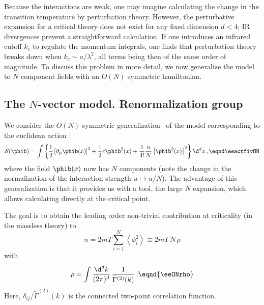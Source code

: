     Because the interactions are weak, one may imagine calculating the change in the transition temperature by perturbation theory.  However, the
perturbative expansion for a critical theory does not exist for any fixed
dimension $d<4$; IR divergences prevent a straightforward calculation.  If one
introduces an infrared cutoff $k_c$ to regulate the momentum integrals, one
finds that perturbation theory breaks down when $k_c \sim a/\lambda^2$, all
terms being then of the same order of magnitude.  To discuss this problem in
more detail, we now generalize the model to $N$ component fields with an $O(N)$ symmetric hamiltonian.

\subsection{The $N$-vector model. Renormalization group}

We consider the $O(N)$ symmetric generalization \eactON\ of the model
corresponding to the euclidean action \eeactfivOii:
$$
{\cal S} ( \phib )= \int \left\lbrace{ 1 \over 2} \left[
\partial_{\mu} \phib (x) \right]^2+{1 \over 2}r
\phib^2 (x)+{1 \over 4!}{u\over N} \left[ \phib^2(x) \right]^2 \right\rbrace \d^{d}x\,,
\eqnd\eeactfivON
$$
where the field $\phib(x)$  now has $N$ components (note the change in the normalization of the interaction strength $u\mapsto u/N$).
The advantage of this generalization is that it provides
us with a tool, the large $N$ expansion, which allows calculating directly at
the critical point.

The goal is to obtain the leading order non-trivial contribution at
criticality (in the massless theory) to
$$
n=2mT \sum_{i=1}^N  \left<\phi_i^2 \right> \equiv {2mT \,
N\,}\rho
$$
with
$$
\rho= \int\lfrac{\d^d k}{(2\pi)^d}\,\lfrac{1}{\tilde\Gamma^{(2)}(k)}\,.\eqnd{\eeONrho}
$$
Here, $\delta_{ij}/{\tilde\Gamma^{(2)}(k)}$ is the connected two-point correlation
function.

